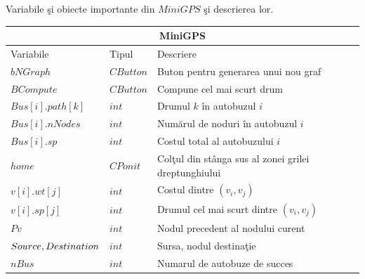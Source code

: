 \documentclass[11pt,a4paper]{report}
\begin{document}
     
      \vspace{0.2cm} Variabile \c si obiecte importante din $MiniGPS$ \c si descrierea lor.
     \begin{center}
     	\begin{tabular}{ |p{2.4cm}|p{2cm}|p{7cm}|  }
     		
     		\hline
     		\multicolumn{3}{|c|}{MiniGPS} \\
     		\hline
     		
     		Variabile & Tipul & Descriere\\
     		\hline
     		
     		$bNGraph$        & $CButton$   & Buton pentru generarea unui nou graf\vspace{0.1cm}  \\
     		\hline
     		$BCompute$       & $CButton$   & Compune cel mai scurt drum\vspace{0.1cm} \\
     		\hline
     		$Bus[i].path[k]$ & $int$       & Drumul $k$ \^ in autobuzul $i$\vspace{0.1cm} \\
     		\hline
     		$Bus[i].nNodes$  & $int$       & Num\u arul de noduri \^ in autobuzul $i$ \vspace{0.1cm}\\
     		\hline
     		$Bus[i].sp$      & $int$       & Costul total al autobuzului $i$\vspace{0.1cm}\\
     		\hline
     		$home$           & $CPonit$    & Col\c tul din st\^ anga sus al zonei grilei dreptunghiului \vspace{0.1cm}   \\
     		\hline
     		$v[i].wt[j]$     & $int$       & Costul dintre $(v_{i}, v_{j})$\vspace{0.1cm}\\
     		\hline
     		$v[i].sp[j]$     & $int$       & Drumul cel mai scurt dintre $(v_{i}, v_{j})$\vspace{0.1cm}\\
     		\hline
     		$Pv$             & $int$       & Nodul precedent al nodului curent\vspace{0.1cm}\\
     		\hline
     		$Source, \newline Destination$         & $int$       & Sursa, nodul destina\c tie\vspace{0.1cm}\\
     		\hline
     		$nBus$           & $int$       & Numarul de autobuze de succes\vspace{0.1cm}\\

\end{tabular}
\end{center}
\end{document}

